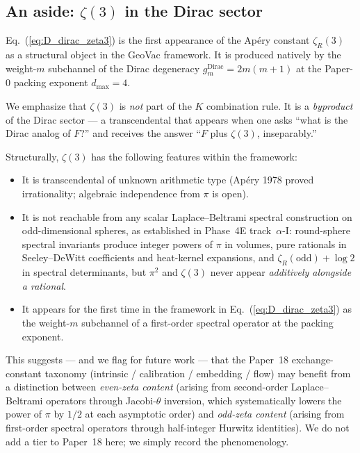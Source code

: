 \documentclass[aps,prl,twocolumn,superscriptaddress]{revtex4-2}
\begin{document}
\subsection{An aside: $\zeta(3)$ in the Dirac sector}\label{sec:zeta3_aside}

Eq.~(\ref{eq:D_dirac_zeta3}) is the first appearance of the Apéry
constant $\zeta_R(3)$ as a structural object in the GeoVac framework.
It is produced natively by the weight-$m$ subchannel of the Dirac
degeneracy $g_{m}^{\text{Dirac}} = 2m(m+1)$ at the Paper-0 packing
exponent $d_{\max} = 4$.

We emphasize that $\zeta(3)$ is \emph{not} part of the $K$ combination
rule. It is a \emph{byproduct} of the Dirac sector — a transcendental
that appears when one asks ``what is the Dirac analog of $F$?'' and
receives the answer ``$F$ plus $\zeta(3)$, inseparably.''

Structurally, $\zeta(3)$ has the following features within the
framework:

\begin{itemize}
  \item It is transcendental of unknown arithmetic type (Apéry 1978
    proved irrationality; algebraic independence from $\pi$ is open).
  \item It is not reachable from any scalar Laplace--Beltrami spectral
    construction on odd-dimensional spheres, as established in Phase~4E
    track~$\alpha$-I: round-sphere spectral invariants produce
    integer powers of $\pi$ in volumes, pure rationals in Seeley--DeWitt
    coefficients and heat-kernel expansions, and $\zeta_{R}(\text{odd})
    + \log 2$ in spectral determinants, but $\pi^{2}$ and $\zeta(3)$
    never appear \emph{additively alongside a rational}.
  \item It appears for the first time in the framework in
    Eq.~(\ref{eq:D_dirac_zeta3}) as the weight-$m$ subchannel of a
    first-order spectral operator at the packing exponent.
\end{itemize}

This suggests — and we flag for future work — that the Paper~18
exchange-constant taxonomy (intrinsic / calibration / embedding / flow)
may benefit from a distinction between \emph{even-zeta content} (arising
from second-order Laplace--Beltrami operators through Jacobi-$\theta$
inversion, which systematically lowers the power of $\pi$ by $1/2$ at
each asymptotic order) and \emph{odd-zeta content} (arising from
first-order spectral operators through half-integer Hurwitz
identities). We do not add a tier to Paper~18 here; we simply record
the phenomenology.
\end{document}

